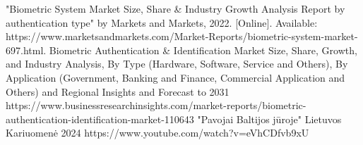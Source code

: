 \documentclass[a4paper,12pt,fleqn]{article}
\begin{document}
\begin{thebibliography}{ 9}
  "Biometric System Market Size, Share \& Industry Growth Analysis Report by authentication type" by Markets and Markets, 2022. [Online]. Available: https://www.marketsandmarkets.com/Market-Reports/biometric-system-market-697.html.
   Biometric Authentication \& Identification Market Size, Share, Growth, and Industry Analysis, By Type (Hardware, Software, Service and Others), By Application (Government, Banking and Finance, Commercial Application and Others) and Regional Insights and Forecast to 2031 https://www.businessresearchinsights.com/market-reports/biometric-authentication-identification-market-110643
   "Pavojai Baltijos jūroje" Lietuvos Kariuomenė 2024 https://www.youtube.com/watch?v=eVhCDfvb9xU 
\end{thebibliography} 
\end{document}
